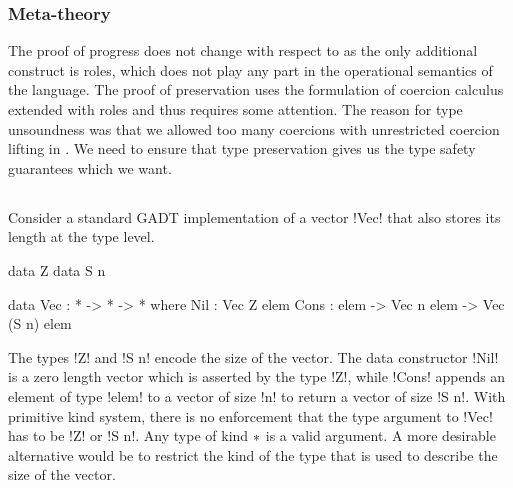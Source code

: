 \documentclass[manuscript,screen,nonacm]{acmart}
\begin{document}
\subsubsection{Meta-theory}






The proof of progress does not change with respect to \SFC as the only additional construct is roles, which does not play any part in the operational semantics of the language. The proof of preservation uses the formulation of coercion calculus extended with roles and thus requires some attention. The reason for type unsoundness was that we allowed too many coercions with unrestricted coercion lifting in \SFC. We need to ensure that type preservation gives us the type safety guarantees which we want.


\subsection{\SFP}\label{sec:sfp} %
Consider a standard GADT implementation of a vector !Vec! that also stores its length at the type level.

\begin{minipage}[ht]{0.4\linewidth}
 \begin{code}
 data Z
 data S n
 \end{code}
\end{minipage}%
\begin{minipage}[ht]{0.4\linewidth}
\begin{code}
 data Vec : * -> * -> * where
 Nil : Vec Z elem
 Cons : elem -> Vec n elem -> Vec (S n) elem
\end{code}
\end{minipage}

The types !Z! and !S n! encode the size of the vector. The data constructor !Nil! is a zero length vector which is asserted by the type !Z!, while !Cons! appends an element of type !elem! to a vector of size !n! to return a vector of size !S n!. With primitive kind system, there is no enforcement that the type argument to !Vec! has to be !Z! or !S n!. Any type of kind $\ast$ is a valid argument. A more desirable alternative would be to restrict the kind of the type that is used to describe the size of the vector.
\end{document}
